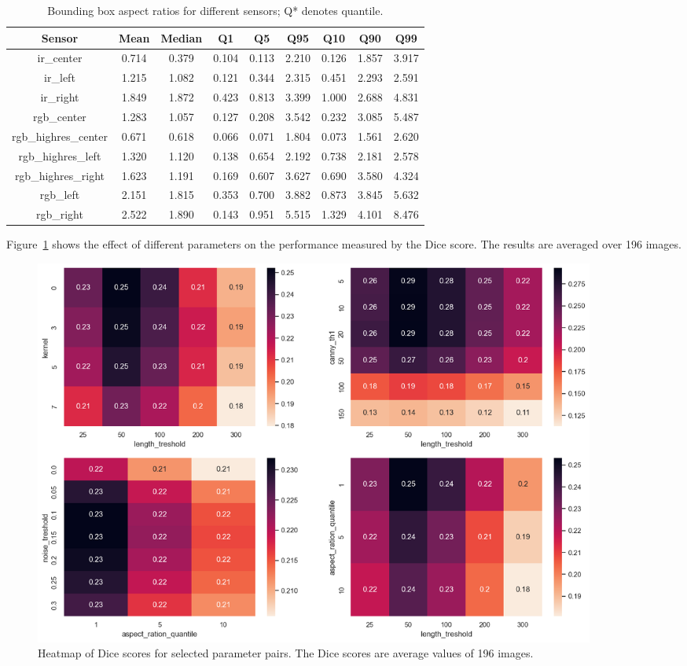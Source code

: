 \documentclass[Master,MDS,english]{BASE/twbook} %
\begin{document}
\begin{table}[ht]
\centering
\footnotesize
\begin{tabular}{|c|S[table-format=1.3]|S[table-format=1.3]|S[table-format=1.3]|S[table-format=1.3]|S[table-format=1.3]|S[table-format=1.3]|S[table-format=1.3]|S[table-format=1.3]|}
\hline
\textbf{Sensor} & \textbf{Mean} & \textbf{Median} & \textbf{Q1} & \textbf{Q5} & \textbf{Q95} & \textbf{Q10} & \textbf{Q90} & \textbf{Q99} \\
\hline
ir\_center & 0.714 & 0.379 & 0.104 & 0.113 & 2.210 & 0.126 & 1.857 & 3.917 \\
ir\_left & 1.215 & 1.082 & 0.121 & 0.344 & 2.315 & 0.451 & 2.293 & 2.591 \\
ir\_right & 1.849 & 1.872 & 0.423 & 0.813 & 3.399 & 1.000 & 2.688 & 4.831 \\
rgb\_center & 1.283 & 1.057 & 0.127 & 0.208 & 3.542 & 0.232 & 3.085 & 5.487 \\
rgb\_highres\_center & 0.671 & 0.618 & 0.066 & 0.071 & 1.804 & 0.073 & 1.561 & 2.620 \\
rgb\_highres\_left & 1.320 & 1.120 & 0.138 & 0.654 & 2.192 & 0.738 & 2.181 & 2.578 \\
rgb\_highres\_right & 1.623 & 1.191 & 0.169 & 0.607 & 3.627 & 0.690 & 3.580 & 4.324 \\
rgb\_left & 2.151 & 1.815 & 0.353 & 0.700 & 3.882 & 0.873 & 3.845 & 5.632 \\
rgb\_right & 2.522 & 1.890 & 0.143 & 0.951 & 5.515 & 1.329 & 4.101 & 8.476 \\
\hline
\end{tabular}
\caption{Bounding box aspect ratios for different sensors; Q* denotes quantile.}
\label{tab:sensor_stats}
\end{table}


Figure~\ref{fig:fld_params} shows the effect of different parameters on the performance measured by the Dice score. The results are averaged over 196 images. 

\begin{figure}[h]
\centering
\includegraphics[width=0.9\textwidth]{images/fld/parameter_tuning}
\caption{Heatmap of Dice scores for selected parameter pairs. The Dice scores are average values of 196 images. }
\label{fig:fld_params}
\end{figure}
\end{document}
